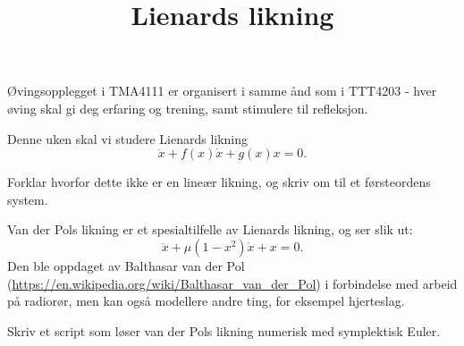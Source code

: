 \documentclass[a4paper,norsk,11pt]{interaktiv}
\title{Lienards likning}
\begin{document}

\maketitle


Øvingsopplegget i TMA4111 er organisert i samme ånd som i TTT4203 - hver øving skal gi deg erfaring og trening, 
samt stimulere til refleksjon. 



Denne uken skal vi studere Lienards likning
\[
\ddot{x}+ f(x)\dot{x}+g(x)x=0.
\]


\begin{oppgave}{1}
Forklar hvorfor dette ikke er en lineær likning, 
og skriv om til et førsteordens system.
\end{oppgave}

Van der Pols likning er et spesialtilfelle av Lienards likning, 
og ser slik ut:
\[
\ddot{x}+ \mu(1-x^2)\dot{x}+x=0.
\]
Den ble oppdaget av Balthasar van der Pol (\url{https://en.wikipedia.org/wiki/Balthasar_van_der_Pol}) i forbindelse med arbeid på radiorør,
men kan også modellere andre ting, for eksempel hjerteslag.


\begin{oppgave}{2}
Skriv et script som løser van der Pols likning numerisk med symplektisk Euler. 
\end{oppgave}
\end{document}
